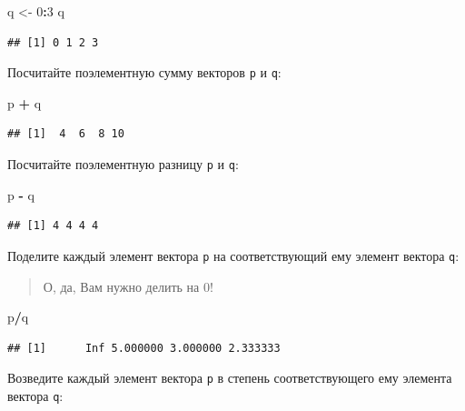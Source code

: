 \documentclass[]{book}
\newenvironment{Shaded}{\begin{snugshade}}{\end{snugshade}}
\newcommand{\DecValTok}[1]{\textcolor[rgb]{0.00,0.00,0.81}{#1}}
\newcommand{\StringTok}[1]{\textcolor[rgb]{0.31,0.60,0.02}{#1}}
\newcommand{\OperatorTok}[1]{\textcolor[rgb]{0.81,0.36,0.00}{\textbf{#1}}}
\newcommand{\NormalTok}[1]{#1}
\begin{document}
\begin{Shaded}
\begin{Highlighting}[]
\NormalTok{q <-}\StringTok{ }\DecValTok{0}\OperatorTok{:}\DecValTok{3}
\NormalTok{q}
\end{Highlighting}
\end{Shaded}

\begin{verbatim}
## [1] 0 1 2 3
\end{verbatim}

Посчитайте поэлементную сумму векторов \texttt{p} и \texttt{q}:

\begin{Shaded}
\begin{Highlighting}[]
\NormalTok{p }\OperatorTok{+}\StringTok{ }\NormalTok{q}
\end{Highlighting}
\end{Shaded}

\begin{verbatim}
## [1]  4  6  8 10
\end{verbatim}

Посчитайте поэлементную разницу \texttt{p} и \texttt{q}:

\begin{Shaded}
\begin{Highlighting}[]
\NormalTok{p }\OperatorTok{-}\StringTok{ }\NormalTok{q}
\end{Highlighting}
\end{Shaded}

\begin{verbatim}
## [1] 4 4 4 4
\end{verbatim}

Поделите каждый элемент вектора \texttt{p} на соответствующий ему
элемент вектора \texttt{q}:

\begin{quote}
О, да, Вам нужно делить на 0!
\end{quote}

\begin{Shaded}
\begin{Highlighting}[]
\NormalTok{p}\OperatorTok{/}\NormalTok{q}
\end{Highlighting}
\end{Shaded}

\begin{verbatim}
## [1]      Inf 5.000000 3.000000 2.333333
\end{verbatim}

Возведите каждый элемент вектора \texttt{p} в степень соответствующего
ему элемента вектора \texttt{q}:
\end{document}
